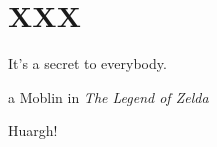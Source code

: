 \chapter{XXX\label{chap:XXX}}
\epigraph{It's a secret to everybody.}{a Moblin in \textit{The Legend of Zelda}}

Huargh! \cite{altland_simons_2010}
